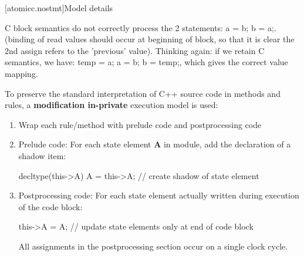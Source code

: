 [atomicc.nostmt]{Model details}

C block semantics do not correctly process the 2 statements: a = b; b = a;.
(binding of read values should occur at beginning of block, so that it is clear the
2nd assign refers to the 'previous' value).
Thinking again: if we retain C semantics, we have: temp = a; a = b; b = temp;, which
gives the correct value mapping.

To preserve the standard interpretation of C++ source code
in methods and rules,
a \textbf{modification in-private} \cite[Sec.~3.2]{Prinz03operationalsemantics}
execution model is used:
\begin{enumerate}
\item Wrap each rule/method with prelude code and postprocessing code
\item Prelude code:
For each state element \textbf{A} in module, add the declaration of a shadow item:
\begin{codeblock}
decltype(this->A) A = this->A;    // create shadow of state element
\end{codeblock}
\item Postprocessing code:
For each state element actually written during execution of the code block:
\begin{codeblock}
this->A = A;                // update state elements only at end of code block
\end{codeblock}
All assignments in the postprocessing section occur on a single clock cycle.
\end{enumerate}
